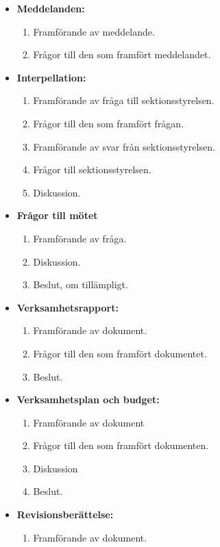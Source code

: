 \documentclass[11pt, includeaddress]{classes/cthit}
\begin{document}
\begin{itemize}
    \item \textbf{Meddelanden:}
    \begin{enumerate}
        \item Framförande av meddelande.
        \item Frågor till den som framfört meddelandet.
    \end{enumerate}
    \item \textbf{Interpellation:}
    \begin{enumerate}
        \item Framförande av fråga till sektionsstyrelsen.
        \item Frågor till den som framfört frågan.
        \item Framförande av svar från sektionsstyrelsen.
        \item Frågor till sektionsstyrelsen.
        \item Diskussion.
    \end{enumerate}
    \item \textbf{Frågor till mötet}
    \begin{enumerate}
        \item Framförande av fråga.
        \item Diskussion.
        \item Beslut, om tillämpligt.
    \end{enumerate}
    \item \textbf{Verksamhetsrapport:}
    \begin{enumerate}
        \item Framförande av dokument.
        \item Frågor till den som framfört dokumentet.
        \item Beslut.
    \end{enumerate}
    \item \textbf{Verksamhetsplan och budget:}
    \begin{enumerate}
        \item Framförande av dokument
        \item Frågor till den som framfört dokumenten.
        \item Diskussion
        \item Beslut.
    \end{enumerate}
    \item \textbf{Revisionsberättelse:}
    \begin{enumerate}
        \item Framförande av dokument.

\end{enumerate}
\end{itemize}
\end{document}
